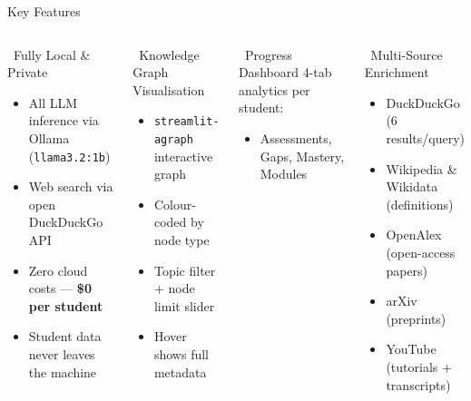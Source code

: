 \documentclass[aspectratio=169,9pt]{beamer}
\begin{document}
\begin{frame}{Key Features}
\begin{columns}[T]

  \begin{block}{\faLock\ Fully Local \& Private}
    \begin{itemize}
      \item All LLM inference via Ollama (\texttt{llama3.2:1b})
      \item Web search via open DuckDuckGo API
      \item Zero cloud costs — \textbf{\$0 per student}
      \item Student data never leaves the machine
    \end{itemize}
  \end{block}

  \begin{block}{\faProjectDiagram\ Knowledge Graph Visualisation}
    \begin{itemize}
      \item \texttt{streamlit-agraph} interactive graph
      \item Colour-coded by node type
      \item Topic filter + node limit slider
      \item Hover shows full metadata
    \end{itemize}
  \end{block}

  \begin{block}{\faChartBar\ Progress Dashboard}
    4-tab analytics per student:
    \begin{itemize}
      \item Assessments, Gaps, Mastery, Modules
    \end{itemize}
  \end{block}


  \begin{block}{\faSearch\ Multi-Source Enrichment}
    \begin{itemize}
      \item DuckDuckGo (6 results/query)
      \item Wikipedia \& Wikidata (definitions)
      \item OpenAlex (open-access papers)
      \item arXiv (preprints)
      \item YouTube (tutorials + transcripts)
    \end{itemize}
  \end{block}


\end{columns}
\end{frame}
\end{document}
